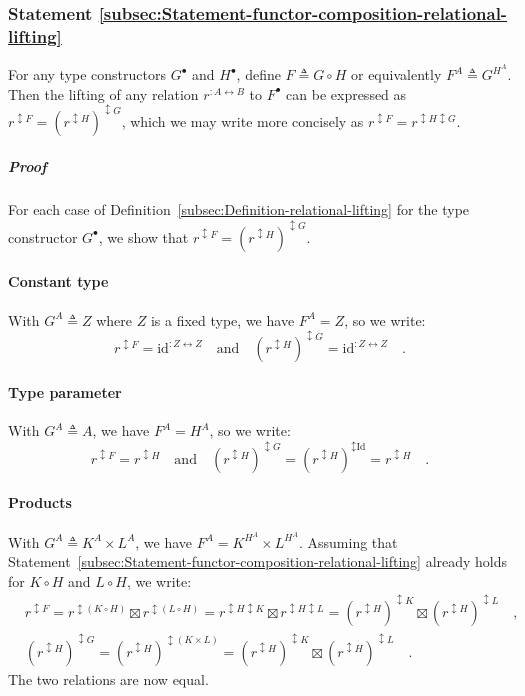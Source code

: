 \subsubsection{Statement \label{subsec:Statement-functor-composition-relational-lifting}\ref{subsec:Statement-functor-composition-relational-lifting}}

For any type constructors $G^{\bullet}$ and $H^{\bullet}$, define
$F\triangleq G\circ H$ or equivalently $F^{A}\triangleq G^{H^{A}}$.
Then the lifting of any relation $r^{:A\leftrightarrow B}$ to $F^{\bullet}$
can be expressed as $r^{\updownarrow F}=(r^{\updownarrow H})^{\updownarrow G}$,
which we may write more concisely as $r^{\updownarrow F}=r^{\updownarrow H\updownarrow G}$.

\subparagraph{Proof}

For each case of Definition~\ref{subsec:Definition-relational-lifting}
for the type constructor $G^{\bullet}$, we show that $r^{\updownarrow F}=(r^{\updownarrow H})^{\updownarrow G}$.

\paragraph{Constant type}

With $G^{A}\triangleq Z$ where $Z$ is a fixed type, we have $F^{A}=Z$,
so we write:
\[
r^{\updownarrow F}=\text{id}^{:Z\leftrightarrow Z}\quad\text{and}\quad(r^{\updownarrow H})^{\updownarrow G}=\text{id}^{:Z\leftrightarrow Z}\quad.
\]


\paragraph{Type parameter}

With $G^{A}\triangleq A$, we have $F^{A}=H^{A}$, so we write:
\[
r^{\updownarrow F}=r^{\updownarrow H}\quad\text{and}\quad(r^{\updownarrow H})^{\updownarrow G}=(r^{\updownarrow H})^{\updownarrow\text{Id}}=r^{\updownarrow H}\quad.
\]


\paragraph{Products}

With $G^{A}\triangleq K^{A}\times L^{A}$, we have $F^{A}=K^{H^{A}}\times L^{H^{A}}$.
Assuming that Statement~\ref{subsec:Statement-functor-composition-relational-lifting}
already holds for $K\circ H$ and $L\circ H$, we write:
\begin{align*}
 & r^{\updownarrow F}=r^{\updownarrow(K\circ H)}\boxtimes r^{\updownarrow(L\circ H)}=r^{\updownarrow H\updownarrow K}\boxtimes r^{\updownarrow H\updownarrow L}=(r^{\updownarrow H})^{\updownarrow K}\boxtimes(r^{\updownarrow H})^{\updownarrow L}\quad,\\
 & (r^{\updownarrow H})^{\updownarrow G}=(r^{\updownarrow H})^{\updownarrow(K\times L)}=(r^{\updownarrow H})^{\updownarrow K}\boxtimes(r^{\updownarrow H})^{\updownarrow L}\quad.
\end{align*}
The two relations are now equal.

